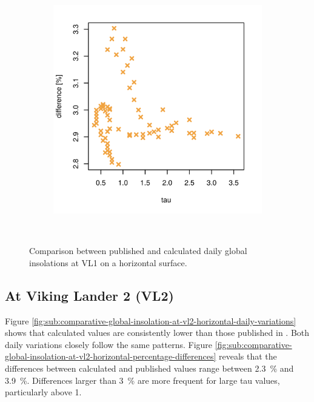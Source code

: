 \begin{figure}[H]
\begin{subfigure}[t]{\subfigureWidth}
            \label{fig:sub:comparative-global-insolation-at-vl1-horizontal-daily-variations}
    \end{subfigure}\hfill
    \begin{subfigure}[t]{\subfigureWidth}
        \centering
            \includegraphics[height=\graphicsHeight]{sections/appendix/A/plots/hh-diff-bet-exp-calc-at-vl1.png}
            \label{fig:sub:comparative-global-insolation-at-vl1-horizontal-percentage-differences}
    \end{subfigure}\\[0.8ex]
    \caption{Comparison between published and calculated daily global insolations at \ac{VL1} on a horizontal surface.}
    \label{fig:plot:comparative-global-insolation-at-vl1-horizontal}
\vspace{-2ex}
\end{figure}

\subsection{At Viking Lander 2 (VL2)}
Figure \ref{fig:sub:comparative-global-insolation-at-vl2-horizontal-daily-variations} shows that calculated values are consistently lower than those published in . Both daily variations closely follow the same patterns. Figure \ref{fig:sub:comparative-global-insolation-at-vl2-horizontal-percentage-differences} reveals that the differences between calculated and published values range between \SI{2.3}{\percent} and \SI{3.9}{\percent}. Differences larger than \SI{3}{\percent} are more frequent for large tau values, particularly above 1.

